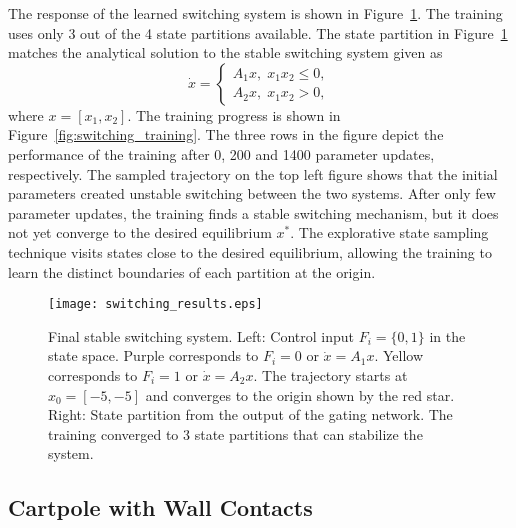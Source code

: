 %
The response of the learned switching system is shown in
Figure~\ref{fig:final_switching}.
%
The training uses only 3 out of the 4 state partitions available.
%
The state partition in Figure~\ref{fig:final_switching} matches the analytical
solution to the stable switching system given as~\cite{liberzon2003switching}
\begin{equation*}
    \dot{x} = \begin{cases}
        A_1x, \; x_1x_2 \leq 0, \\
        A_2x, \; x_1x_2 > 0,
    \end{cases}
\end{equation*}
\noindent where $x=[x_1, x_2]$.
%
The training progress is shown in Figure~\ref{fig:switching_training}.
%
The three rows in the figure depict the performance of the training after 0, 200
and 1400 parameter updates, respectively.
%
The sampled trajectory on the top left figure shows that the initial parameters
created unstable switching between the two systems.
%
After only few parameter updates, the training finds a stable switching
mechanism, but it does not yet converge to the desired equilibrium $x^*$.
%
The explorative state sampling technique visits states close to the desired
equilibrium, allowing the training to learn the distinct boundaries of each
partition at the origin. 
\begin{figure}[tb]
    \centering
    \texttt{[image: switching\_results.eps]}
    \caption{Final stable switching system. Left: Control input $F_i=\{0, 1\}$ in
    the state space. Purple corresponds to $F_i=0$ or $\dot{x} = A_1x$. Yellow
    corresponds to $F_i=1$ or $\dot{x} = A_2x$. The trajectory starts at $x_0=[-5,
    -5]$ and converges to the origin shown by the red star. Right: State
    partition from the output of the gating network. The training converged to 3
    state partitions that can stabilize the system.}
    \label{fig:final_switching}
\end{figure}

\subsection{Cartpole with Wall Contacts}
\label{ssec:cartpole_with_walls}

